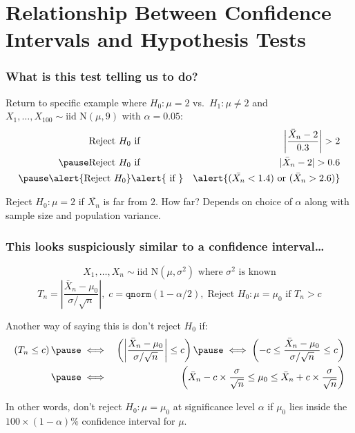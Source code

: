 \section{Relationship Between Confidence Intervals and Hypothesis Tests}
\begin{frame}
  \frametitle{What is this test telling us to do?}
  Return to specific example where $H_0\colon \mu = 2$ vs.\ $H_1\colon \mu \neq 2$ and $X_1, \dots, X_{100} \sim \mbox{iid N}(\mu, 9)$ with $\alpha = 0.05$:
  \begin{eqnarray*}
    \mbox{Reject } H_0 &\mbox{ if }& \left|\frac{\bar{X}_n - 2}{0.3}\right| > 2\\\pause
     \mbox{Reject } H_0 &\mbox{ if }&|\bar{X}_n - 2| > 0.6 \\ \pause
     \alert{\mbox{Reject } H_0} &\alert{\mbox{ if }}& \alert{(\bar{X_n} < 1.4) \mbox{ or } (\bar{X}_n > 2.6)} 
  \end{eqnarray*}

  Reject $H_0\colon \mu = 2$ if $\bar{X_n}$ is far from $2$. 
  How far?
  Depends on choice of $\alpha$ along with sample size and population variance.
\end{frame}
\begin{frame}
  \frametitle{This looks suspiciously similar to a confidence interval\dots}

  \small 
  \[
    \boxed{X_1, \dots, X_n \sim \mbox{iid N}(\mu, \sigma^2) \mbox{ where }\sigma^2 \mbox{ is known}}
  \]
  \[
    \boxed{T_n = \displaystyle\left|\frac{\bar{X}_n - \mu_0}{\sigma/\sqrt{n}}\right|, \; c = \texttt{qnorm}(1 - \alpha/2), \; \mbox{Reject } H_0\colon \mu = \mu_0 \mbox{ if } T_n > c}
  \]

  \vspace{1em}
  Another way of saying this is don't reject $H_0$ if:
  \begin{eqnarray*}
    \left(T_n \leq c\right) \pause &\iff&
    \left(\left|\frac{\bar{X}_n - \mu_0}{\sigma/\sqrt{n}}\right| \leq c \right) \pause
    \iff \left(-c \leq \frac{\bar{X}_n - \mu_0}{\sigma/\sqrt{n}}\leq c\right)\\ \pause
    &\iff& \left(\bar{X}_n - c \times \frac{\sigma}{\sqrt{n}} \leq \mu_0 \leq \bar{X}_n + c\times\frac{\sigma}{\sqrt{n}}  \right)
  \end{eqnarray*}

  \pause

  \alert{In other words, don't reject $H_0\colon \mu = \mu_0$ at significance level $\alpha$ if $\mu_0$ lies inside the $100 \times (1 - \alpha)\%$ confidence interval for $\mu$.}

\end{frame}
